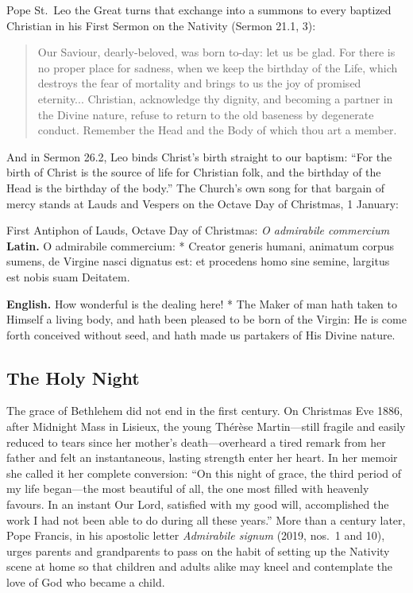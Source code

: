 Pope St.~Leo the Great turns that exchange into a summons to every baptized
Christian in his First Sermon on the Nativity (Sermon 21.1, 3):

\begin{quote}
Our Saviour, dearly-beloved, was born to-day: let us be glad. For there is no
proper place for sadness, when we keep the birthday of the Life, which destroys
the fear of mortality and brings to us the joy of promised eternity...
Christian, acknowledge thy dignity, and becoming a partner in the Divine
nature, refuse to return to the old baseness by degenerate conduct. Remember
the Head and the Body of which thou art a member.
\end{quote}

And in Sermon 26.2, Leo binds Christ's birth straight to our baptism: ``For the
birth of Christ is the source of life for Christian folk, and the birthday of
the Head is the birthday of the body.'' The Church's own song for that bargain
of mercy stands at Lauds and Vespers on the Octave Day of Christmas, 1 January:

\begin{massbox}{First Antiphon of Lauds, Octave Day of Christmas: \textit{O admirabile commercium}}
\textbf{Latin.} O admirabile commercium: * Creator generis humani, animatum
corpus sumens, de Virgine nasci dignatus est: et procedens homo sine semine,
largitus est nobis suam Deitatem.

\textbf{English.} How wonderful is the dealing here! * The Maker of man hath
taken to Himself a living body, and hath been pleased to be born of the Virgin:
He is come forth conceived without seed, and hath made us partakers of His
Divine nature.
\end{massbox}

\subsection{The Holy Night}

The grace of Bethlehem did not end in the first century. On Christmas Eve 1886,
after Midnight Mass in Lisieux, the young Th\'er\`ese Martin---still fragile
and easily reduced to tears since her mother's death---overheard a tired remark
from her father and felt an instantaneous, lasting strength enter her heart. In
her memoir she called it her complete conversion: ``On this night of grace, the
third period of my life began---the most beautiful of all, the one most filled
with heavenly favours. In an instant Our Lord, satisfied with my good will,
accomplished the work I had not been able to do during all these years.'' More
than a century later, Pope Francis, in his apostolic letter \textit{Admirabile
signum} (2019, nos.~1 and 10), urges parents and grandparents to pass on the
habit of setting up the Nativity scene at home so that children and adults
alike may kneel and contemplate the love of God who became a child.

